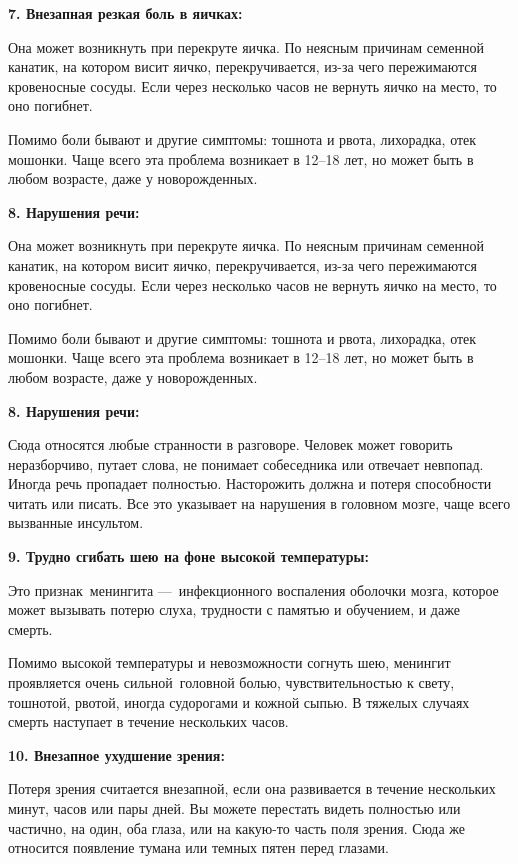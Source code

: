 \documentclass[a4paper, 12pt]{article}
\theoremstyle{definition}
\begin{document}
        \textbf{7. Внезапная резкая боль в яичках:}
        
        Она может возникнуть при перекруте яичка. По неясным причинам семенной канатик, на котором висит яичко, перекручивается, из-за чего пережимаются кровеносные сосуды. Если через несколько часов не вернуть яичко на место, то оно погибнет. 
    
        Помимо боли бывают и другие симптомы: тошнота и рвота, лихорадка, отек мошонки. Чаще всего эта проблема возникает в 12–18 лет, но может быть в любом возрасте, даже у новорожденных.

        \textbf{8. Нарушения речи:}
        
        Она может возникнуть при перекруте яичка. По неясным причинам семенной канатик, на котором висит яичко, перекручивается, из-за чего пережимаются кровеносные сосуды. Если через несколько часов не вернуть яичко на место, то оно погибнет. 
    
        Помимо боли бывают и другие симптомы: тошнота и рвота, лихорадка, отек мошонки. Чаще всего эта проблема возникает в 12–18 лет, но может быть в любом возрасте, даже у новорожденных.

        \textbf{8. Нарушения речи:}
        
        Сюда относятся любые странности в разговоре. Человек может говорить неразборчиво, путает слова, не понимает собеседника или отвечает невпопад. Иногда речь пропадает полностью. Насторожить должна и потеря способности читать или писать. Все это указывает на нарушения в головном мозге, чаще всего вызванные инсультом. 

        \textbf{9. Трудно сгибать шею на фоне высокой температуры:}
        
        Это признак менингита — инфекционного воспаления оболочки мозга, которое может вызывать потерю слуха, трудности с памятью и обучением, и даже смерть. 

        Помимо высокой температуры и невозможности согнуть шею, менингит проявляется очень сильной головной болью, чувствительностью к свету, тошнотой, рвотой, иногда судорогами и кожной сыпью. В тяжелых случаях смерть наступает в течение нескольких часов.

        \textbf{10. Внезапное ухудшение зрения:}
        
        Потеря зрения считается внезапной, если она развивается в течение нескольких минут, часов или пары дней. Вы можете перестать видеть полностью или частично, на один, оба глаза, или на какую-то часть поля зрения. Сюда же относится появление тумана или темных пятен перед глазами. 
\end{document}

